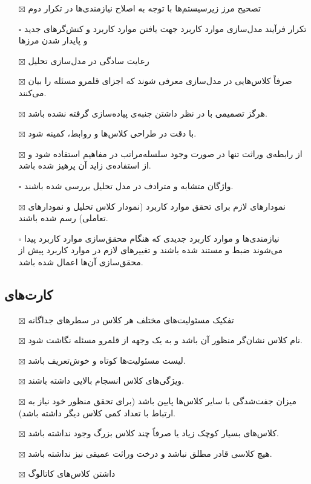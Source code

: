 \begin{itemize}
	\item[$\boxtimes$]
	تصحیح مرز زیرسیستم‌ها با توجه به اصلاح نیازمندی‌ها در تکرار دوم
	\item[$\square$]
	تکرار فرآیند مدل‌سازی موارد کاربرد جهت یافتن موارد کاربرد و کنش‌گرهای جدید و پایدار شدن مرزها
	\item[$\boxtimes$]
	رعایت سادگی در مدل‌سازی تحلیل
	\item[$\boxtimes$]
	صرفاً کلاس‌هایی در مدل‌سازی معرفی شوند که اجزای قلمرو مسئله را بیان می‌کنند.
	\item[$\boxtimes$]
	هرگز تصمیمی با در نظر داشتن جنبه‌ی پیاده‌سازی گرفته نشده باشد.
	\item[$\boxtimes$]
	با دقت در طراحی کلاس‌ها و روابط،  کمینه شود.
	\item[$\boxtimes$]
	از رابطه‌ی وراثت تنها در صورت وجود سلسله‌مراتب در مفاهیم استفاده شود و از استفاده‌ی زاید آن پرهیز شده باشد.
	\item[$\square$]
	واژگان متشابه و مترادف در مدل تحلیل بررسی شده باشند.
	\item[$\boxtimes$]
	نمودارهای لازم برای تحقق موارد کاربرد (نمودار کلاس تحلیل و نمودارهای تعاملی) رسم شده باشند.
	\item[$\square$]
	نیازمندی‌ها و موارد کاربرد جدیدی که هنگام محقق‌سازی موارد کاربرد پیدا می‌شوند ضبط و مستند شده باشند و تغییرهای لازم در موارد کاربرد پیش از محقق‌سازی آن‌ها اعمال شده باشد.
\end{itemize}

\subsection{کارت‌های }

\begin{itemize}
	\item[$\boxtimes$]
	تفکیک مسئولیت‌های مختلف هر کلاس در سطرهای جداگانه
	\item[$\boxtimes$]
	نام کلاس نشان‌گر منظور آن باشد و به یک وجهه از قلمرو مسئله نگاشت شود.
	\item[$\boxtimes$]
	لیست مسئولیت‌ها کوتاه و خوش‌تعریف باشد.
	\item[$\boxtimes$]
	ویژگی‌های کلاس انسجام بالایی داشته باشند.
	\item[$\boxtimes$]
	میزان جفت‌شدگی با سایر کلاس‌ها پایین باشد (برای تحقق منظور خود نیاز به ارتباط با تعداد کمی کلاس دیگر داشته باشد).
	\item[$\boxtimes$]
	کلاس‌های بسیار کوچک زیاد یا صرفاً چند کلاس بزرگ وجود نداشته باشد.
	\item[$\boxtimes$]
	هیچ کلاسی قادر مطلق نباشد و درخت وراثت عمیقی نیز نداشته باشد.
	\item[$\boxtimes$]
	داشتن کلاس‌های کاتالوگ
\end{itemize}

